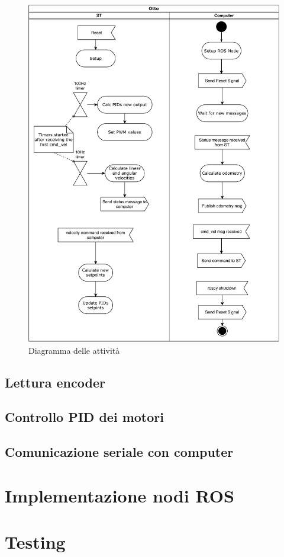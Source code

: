 \begin{figure}[H]
    \centering
    \includegraphics[scale=0.7]{images/uml_activities.pdf}
    \caption{Diagramma delle attività}
\end{figure}



\subsection{Lettura encoder}
\subsection{Controllo PID dei motori}
\cite{cross_pid}
\subsection{Comunicazione seriale con computer}
\section{Implementazione nodi ROS}
\section{Testing}
